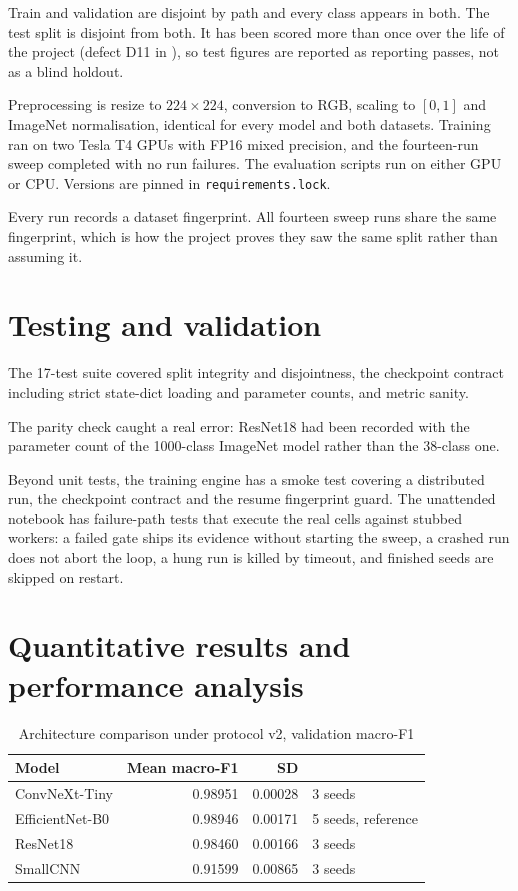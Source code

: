 \documentclass[12pt,a4paper]{report}
\newcommand{\tabfont}{\small}
\begin{document}
Train and validation are disjoint by path and every class appears in both. The test
split is disjoint from both. It has been scored more than once over the life of the
project (defect D11 in ), so test figures are reported
as reporting passes, not as a blind holdout.

Preprocessing is resize to $224\times224$, conversion to RGB, scaling to $[0,1]$ and
ImageNet normalisation, identical for every model and both datasets. Training ran on
two Tesla T4 GPUs with FP16 mixed precision, and the fourteen-run sweep completed with
no run failures. The evaluation scripts run on either GPU or CPU. Versions are pinned
in \texttt{requirements.lock}.

Every run records a dataset fingerprint. All fourteen sweep runs share the same
fingerprint, which is how the project proves they saw the same split rather than
assuming it.

\section{Testing and validation}

The 17-test suite covered split integrity and disjointness, the checkpoint contract
including strict state-dict loading and parameter counts, and metric sanity.

The parity check caught a real error: ResNet18 had been recorded with the parameter
count of the 1000-class ImageNet model rather than the 38-class one.

Beyond unit tests, the training engine has a smoke test covering a distributed run,
the checkpoint contract and the resume fingerprint guard. The unattended notebook has
failure-path tests that execute the real cells against stubbed workers: a failed gate
ships its evidence without starting the sweep, a crashed run does not abort the loop,
a hung run is killed by timeout, and finished seeds are skipped on restart.

\section{Quantitative results and performance analysis}

\begin{table}[H]
\centering
\caption{Architecture comparison under protocol v2, validation macro-F1}
\label{tab:results-mid}
\tabfont
\begin{tabularx}{\textwidth}{@{}lrrY@{}}
\toprule
\textbf{Model} & \textbf{Mean macro-F1} & \textbf{SD} & \\
\midrule
ConvNeXt-Tiny & 0.98951 & 0.00028 & 3 seeds \\
EfficientNet-B0 & 0.98946 & 0.00171 & 5 seeds, reference \\
ResNet18 & 0.98460 & 0.00166 & 3 seeds \\
SmallCNN & 0.91599 & 0.00865 & 3 seeds \\
\bottomrule
\end{tabularx}
\end{table}
\end{document}
